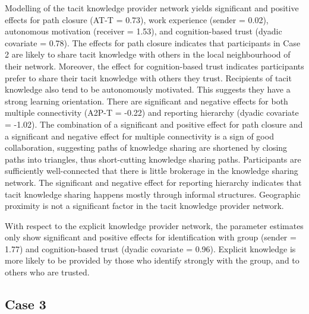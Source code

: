 Modelling of the tacit knowledge provider network yields significant and positive effects for path closure (AT-T = 0.73), work experience (sender = 0.02), autonomous motivation (receiver = 1.53), and cognition-based trust (dyadic covariate = 0.78). The effects for path closure indicates that participants in Case 2 are likely to share tacit knowledge with others in the local neighbourhood of their network. Moreover, the effect for cognition-based trust indicates participants prefer to share their tacit knowledge with others they trust. Recipients of tacit knowledge also tend to be autonomously motivated. This suggests they have a strong learning orientation. There are significant and negative effects for both multiple connectivity (A2P-T = -0.22) and reporting hierarchy (dyadic covariate = -1.02). The combination of a significant and positive effect for path closure and a significant and negative effect for multiple connectivity is a sign of good collaboration, suggesting paths of knowledge sharing are shortened by closing paths into triangles, thus short-cutting knowledge sharing paths. Participants are sufficiently well-connected that there is little brokerage in the knowledge sharing network. The significant and negative effect for reporting hierarchy indicates that tacit knowledge sharing happens mostly through informal structures. Geographic proximity is not a significant factor in the tacit knowledge provider network. \medskip

With respect to the explicit knowledge provider network, the parameter estimates only show significant and positive effects for identification with group (sender = 1.77) and cognition-based trust (dyadic covariate = 0.96). Explicit knowledge is more likely to be provided by those who identify strongly with the group, and to others who are trusted.

\subsection{Case 3}

